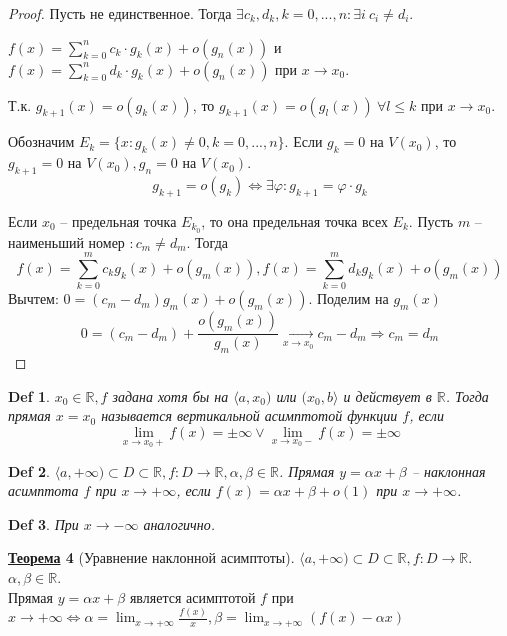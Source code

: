 \documentclass[12pt]{article}
\def\R{\mathbb{R}}       %
\def\PHI{\varphi}        %
\def\SO{\Rightarrow}     %
\def\EQ{\Leftrightarrow} %
\theoremstyle{definition} %
\newtheorem{Thm}{\underline{Теорема}}[subsection] %
\theoremstyle{plain} %
\newtheorem{Def}[Thm]{Def} %
\theoremstyle{remark} %
\begin{document}
\begin{proof}
    Пусть не единственное. Тогда $\exists c_k, d_k, k = 0, ..., n : \exists i \ c_i \neq d_i$.
    
    $f(x) = \sum_{k=0}^{n} c_k \cdot g_k(x) + o(g_n(x))$ и $f(x) = \sum_{k=0}^{n} d_k \cdot g_k(x) + o(g_n(x))$ при $x \to x_0$.
    
    Т.к. $g_{k + 1}(x) = o(g_k(x))$, то $g_{k + 1}(x) = o(g_l(x)) \ \forall l \leqslant k$ при $x \to x_0$.

    Обозначим $E_k = \{x : g_k(x) \neq 0, k = 0, ..., n\}$. Если $g_k = 0$ на $V(x_0)$, то $g_{k + 1} = 0$ на $V(x_0), g_n = 0$ на $V(x_0)$. 
    \[g_{k + 1} = o(g_k) \EQ \exists \PHI : g_{k + 1} = \PHI \cdot g_k\]

    Если $x_0$ -- предельная точка $E_{k_0}$, то она предельная точка всех $E_k$.
    Пусть $m$ -- наименьший номер $: c_m \neq d_m$. Тогда 
    \[f(x) = \sum_{k=0}^{m} c_k g_k(x) + o(g_m(x)), f(x) = \sum_{k=0}^{m} d_k g_k(x) + o(g_m(x))\]
    Вычтем: $0 = (c_m - d_m) g_m(x) + o(g_m(x))$. Поделим на $g_m(x)$ 
    \[0 = (c_m - d_m) + \frac{o(g_m(x))}{g_m(x)} \xrightarrow[x \to x_0]{} c_m - d_m \SO c_m = d_m\]
\end{proof}

\begin{Def}
    $x_0 \in \R, f$ задана хотя бы на $\langle a, x_0)$ или $(x_0, b\rangle$ и действует в $\R$. 
    Тогда прямая $x = x_0$ называется вертикальной асимптотой функции $f$, если 
    \[\lim_{x \to x_0+}f(x) = \pm \infty \vee \lim_{x \to x_0-} f(x) = \pm \infty\] 
\end{Def}

\begin{Def}
    $\langle a, +\infty) \subset D \subset \R, f : D \to \R, \alpha, \beta \in \R$. 
    Прямая $y = \alpha x + \beta$ -- наклонная асимптота $f$ при $x \to +\infty$, если $f(x) = \alpha x + \beta + o(1)$ при $x \to +\infty$.
\end{Def}

\begin{Def}
    При $x \to -\infty$ аналогично.
\end{Def}

\begin{Thm}[Уравнение наклонной асимптоты]
    $\langle a, +\infty) \subset D \subset \R, f : D \to \R$. $\alpha, \beta \in \R$. \\
    Прямая $y = \alpha x + \beta$ является асимптотой $f$ при $x \to +\infty \EQ \alpha = \lim_{x \to +\infty} \frac{f(x)}{x}, \beta = \lim_{x \to +\infty} (f(x) - \alpha x)$    
\end{Thm}
\end{document}
